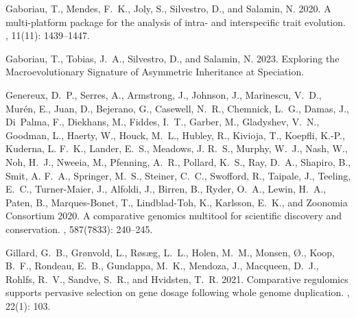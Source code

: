 \documentclass{article}
\begin{document}
\begin{thebibliography}{}
    Gaboriau, T., Mendes, F.~K., Joly, S., Silvestro, D., and Salamin, N. 2020.
    \newblock A multi-platform package for the analysis of intra- and interspecific
    trait evolution.
    , {11}(11): 1439--1447.

    Gaboriau, T., Tobias, J.~A., Silvestro, D., and Salamin, N. 2023.
    \newblock Exploring the {{Macroevolutionary Signature}} of {{Asymmetric
    Inheritance}} at {{Speciation}}.

    Genereux, D.~P., Serres, A., Armstrong, J., Johnson, J., Marinescu, V.~D.,
    Mur{\'e}n, E., Juan, D., Bejerano, G., Casewell, N.~R., Chemnick, L.~G.,
    Damas, J., Di~Palma, F., Diekhans, M., Fiddes, I.~T., Garber, M., Gladyshev,
    V.~N., Goodman, L., Haerty, W., Houck, M.~L., Hubley, R., Kivioja, T.,
    Koepfli, K.-P., Kuderna, L. F.~K., Lander, E.~S., Meadows, J. R.~S., Murphy,
    W.~J., Nash, W., Noh, H.~J., Nweeia, M., Pfenning, A.~R., Pollard, K.~S.,
    Ray, D.~A., Shapiro, B., Smit, A. F.~A., Springer, M.~S., Steiner, C.~C.,
    Swofford, R., Taipale, J., Teeling, E.~C., {Turner-Maier}, J., Alfoldi, J.,
    Birren, B., Ryder, O.~A., Lewin, H.~A., Paten, B., {Marques-Bonet}, T.,
        {Lindblad-Toh}, K., Karlsson, E.~K., and {Zoonomia Consortium} 2020.
    \newblock A comparative genomics multitool for scientific discovery and
    conservation.
    , {587}(7833): 240--245.

    Gillard, G.~B., Gr{\o}nvold, L., R{\o}s{\ae}g, L.~L., Holen, M.~M., Monsen,
        {\O}., Koop, B.~F., Rondeau, E.~B., Gundappa, M.~K., Mendoza, J., Macqueen,
    D.~J., Rohlfs, R.~V., Sandve, S.~R., and Hvidsten, T.~R. 2021.
    \newblock Comparative regulomics supports pervasive selection on gene dosage
    following whole genome duplication.
    , {22}(1): 103.


\end{thebibliography}
\end{document}
